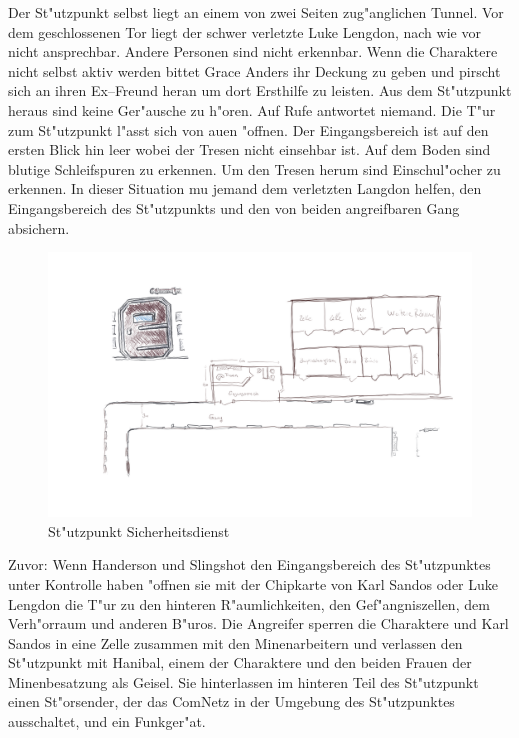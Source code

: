 Der St"utzpunkt selbst liegt an einem von zwei Seiten zug"anglichen Tunnel. Vor dem geschlossenen Tor liegt der schwer verletzte Luke Lengdon, nach wie vor nicht ansprechbar. Andere Personen sind nicht erkennbar. Wenn die Charaktere nicht selbst aktiv werden bittet Grace Anders ihr Deckung zu geben und pirscht sich an ihren Ex--Freund heran um dort Ersthilfe zu leisten. Aus dem St"utzpunkt heraus sind keine Ger"ausche zu h"oren. Auf Rufe antwortet niemand. Die T"ur zum St"utzpunkt l"asst sich von au\3en "offnen. Der Eingangsbereich ist auf den ersten Blick hin leer wobei der Tresen nicht einsehbar ist. Auf dem Boden sind blutige Schleifspuren zu erkennen. Um den Tresen herum sind Einschu\3l"ocher zu erkennen. In dieser Situation mu\3 jemand dem verletzten Langdon helfen, den Eingangsbereich des St"utzpunkts und den von beiden angreifbaren Gang absichern. 

\begin{figure}[htbp]
	\centering
	\includegraphics[width=0.9\linewidth]{./images/sicherheitdienst.png}
    \newline{}St"utzpunkt Sicherheitsdienst
	\label{fig:stuetzpunkt-sicherheitsdienst}
\end{figure}

Zuvor: Wenn Handerson und Slingshot den Eingangsbereich des St"utzpunktes unter Kontrolle haben "offnen sie mit der Chipkarte von Karl Sandos oder Luke Lengdon die T"ur zu den hinteren R"aumlichkeiten, den Gef"angniszellen, dem Verh"orraum und anderen B"uros. Die Angreifer sperren die Charaktere und Karl Sandos in eine Zelle zusammen mit den Minenarbeitern und verlassen den St"utzpunkt mit Hanibal, einem der Charaktere und den beiden Frauen der Minenbesatzung als Geisel. Sie hinterlassen im hinteren Teil des St"utzpunkt einen St"orsender, der das ComNetz in der Umgebung des St"utzpunktes ausschaltet, und ein Funkger"at.  

